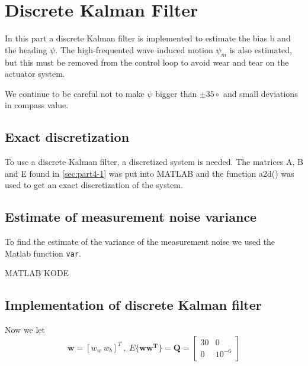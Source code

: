 
\section{Discrete Kalman Filter} \label{sec:part5}
In this part a discrete Kalman filter is implemented to estimate the bias b and the heading $\psi$. The high-frequented wave induced motion $\psi_m$ is also estimated, but this must be removed from the control loop to avoid wear and tear on the actuator system.  

We continue to be careful not to make $\psi$ bigger than $\pm 35 \circ$ and small deviations in compass value. 

\subsection{Exact discretization}
To use a discrete Kalman filter, a discretized system is needed. The matrices A, B and E found in \ref{sec:part4-1} was put into MATLAB and the function a2d() was used to get an exact discretization of the system. 


\subsection{Estimate of measurement noise variance}
To find the estimate of the variance of the measurement noise we used the Matlab function \texttt{var}.
\newline

\label{eq:noise_vaiance} %

MATLAB KODE

\subsection{Implementation of discrete Kalman filter}
Now we let 
\begin{equation}
    \boldsymbol{w} = [w_w \ w_b]^T \ , \ E\{\boldsymbol{w w^T}\} = \boldsymbol{Q} = \begin{bmatrix}
        30 & 0 \\
        0 & 10^{-6} 
    \end{bmatrix}
\end{equation}

